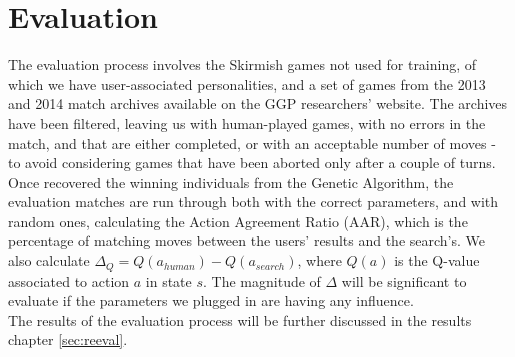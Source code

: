 \section{Evaluation}\label{sec:meteval}
The evaluation process involves the Skirmish games not used for training, of which we have user-associated personalities, and a set of games from the 2013 and 2014 match archives available on the GGP researchers' website\cite{researchggp}. The archives have been filtered, leaving us with human-played games, with no errors in the match, and that are either completed, or with an acceptable number of moves - to avoid considering games that have been aborted only after a couple of turns. \\ 
Once recovered the winning individuals from the Genetic Algorithm, the evaluation matches are run through both with the correct parameters, and with random ones, calculating the Action Agreement Ratio (AAR)\cite{holmgaard2015monte}, which is the percentage of matching moves between the users' results and the search's. We also calculate $\Delta_Q = Q(a_{human}) - Q(a_{search})$, where $Q(a)$ is the Q-value associated to action $a$ in state $s$. The magnitude of $\Delta$ will be significant to evaluate if the parameters we plugged in are having any influence.\\
The results of the evaluation process will be further discussed in the results chapter \ref{sec:reeval}.